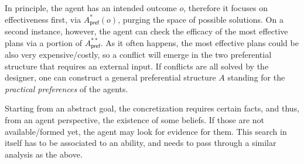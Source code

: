 \documentclass[sigconf,anonymous]{aamas}
\begin{document}
In principle, the agent has an intended outcome $o$, therefore it focuses on effectiveness first, via $A^*_{\mathsf{pref}}(o)$, purging the space of possible solutions. On a second instance, however, the agent can check the efficacy of the most effective plans via a portion of $A_{\mathsf{pref}}^{**}$. As it often happens, the most effective plans could be also very expensive/costly, so a conflict will emerge in the two preferential structure that requires an external input. If conflicts are all solved by the designer, one can construct a general preferential structure $A$ standing for the \textit{practical preferences} of the agents.

Starting from an abstract goal, the concretization requires certain facts, and thus, from an agent perspective, the existence of some beliefs. If those are not available/formed yet, the agent may look for evidence for them. This search in itself has to be associated to an ability, and needs to pass through a similar analysis as the above. 



 


\end{document}
